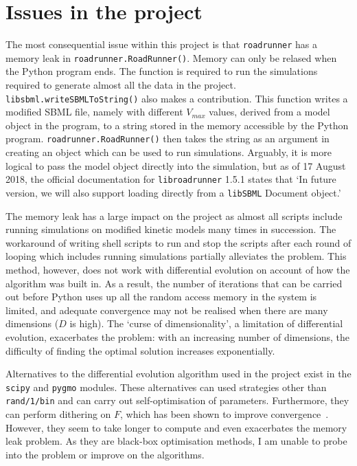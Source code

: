 \documentclass[parskip=full]{scrreprt}
\begin{document}
\section{Issues in the project}
\label{sec:issues}

The most consequential issue within this project is that \texttt{roadrunner} has a memory leak in \texttt{roadrunner.RoadRunner()}. Memory can only be relased when the Python program ends. The function is required to run the simulations required to generate almost all the data in the project. \texttt{libsbml.writeSBMLToString()} also makes a contribution. This function writes a modified SBML file, namely with different $V_{max}$ values, derived from a model object in the program, to a string stored in the memory accessible by the Python program. \texttt{roadrunner.RoadRunner()} then takes the string as an argument in creating an object which can be used to run simulations. Arguably, it is more logical to pass the model object directly into the simulation, but as of 17 August 2018, the official documentation for \texttt{libroadrunner} 1.5.1 states that `In future version, we will also support loading directly from a \texttt{libSBML} Document object.'

The memory leak has a large impact on the project as almost all scripts include running simulations on modified kinetic models many times in succession. The workaround of writing shell scripts to run and stop the scripts after each round of looping which includes running simulations partially alleviates the problem. This method, however, does not work with differential evolution on account of how the algorithm was built in. As a result, the number of iterations that can be carried out before Python uses up all the random access memory in the system is limited, and adequate convergence may not be realised when there are many dimensions ($D$ is high). The `curse of dimensionality', a limitation of differential evolution, exacerbates the problem: with an increasing number of dimensions, the difficulty of finding the optimal solution increases exponentially.

Alternatives to the differential evolution algorithm used in the project exist in the \texttt{scipy} and \texttt{pygmo} modules. These alternatives can used strategies other than \texttt{rand/1/bin} and can carry out self-optimisation of parameters. Furthermore, they can perform dithering on $F$, which has been shown to improve convergence~\cite{storn_differential_1997}. However, they seem to take longer to compute and even exacerbates the memory leak problem. As they are black-box optimisation methods, I am unable to probe into the problem or improve on the algorithms.
\end{document}
